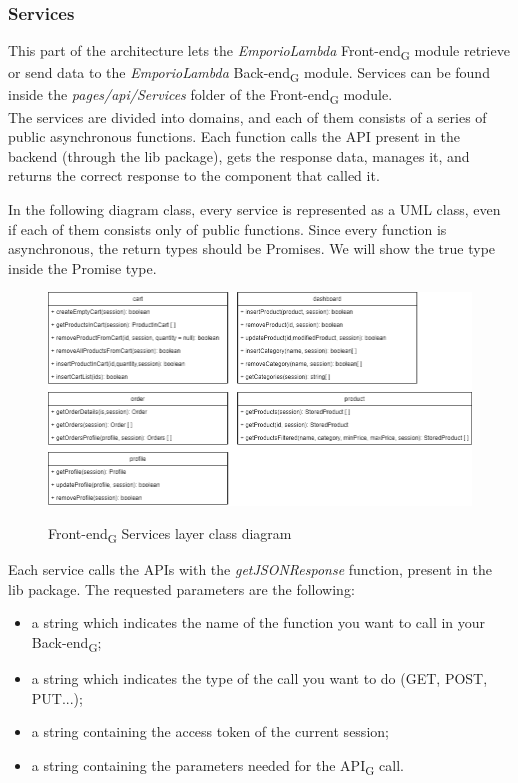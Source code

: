 \subsubsection{Services}
This part of the architecture lets the \textit{EmporioLambda} Front-end\textsubscript{G} module retrieve or send data to the \textit{EmporioLambda} Back-end\textsubscript{G} module. Services can be found inside the \textit{pages/api/Services} folder of the Front-end\textsubscript{G} module.\\

The services are divided into domains, and each of them consists of a series of public asynchronous functions. Each function calls the API present in the backend (through the lib package), gets the response data, manages it, and returns the correct response to the component that called it.

In the following diagram class, every service is represented as a UML class, even if each of them consists only of public functions. Since every function is asynchronous, the return types should be Promises. We will show the true type inside the Promise type.

\begin{figure}[H]
\centering
\includegraphics[scale=0.50]{res/Architettura/Frontend/img/services_frontend_class}\\
\caption{Front-end\textsubscript{G} Services layer class diagram}
\end{figure}


Each service calls the APIs with the \textit{getJSONResponse} function, present in the lib package. The requested parameters are the following:

\begin{itemize}
\item a string which indicates the name of the function you want to call in your Back-end\textsubscript{G}; 
\item a string which indicates the type of the call you want to do (GET, POST, PUT...);
\item a string containing the access token of the current session; 
\item a string containing the parameters needed for the API\textsubscript{G} call. 
\end{itemize} 


